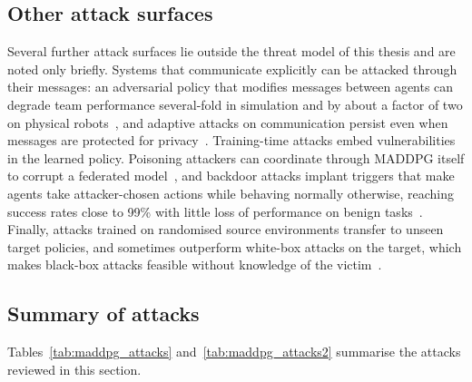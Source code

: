 \subsection{Other attack surfaces}
\label{subsec:lit_other_attacks}

Several further attack surfaces lie outside the threat model of this thesis and are
noted only briefly. Systems that communicate explicitly can be attacked through their
messages: an adversarial policy that modifies messages between agents can degrade team
performance several-fold in simulation and by about a factor of two on physical
robots~\cite{wu2023hijacking}, and adaptive attacks on communication persist even when
messages are protected for privacy~\cite{zhao2023dpmac,yuan2023communicationrobustmultiagentlearningadaptable}.
Training-time attacks embed vulnerabilities in the learned policy. Poisoning attackers
can coordinate through MADDPG itself to corrupt a federated model~\cite{shen2021coordinated},
and backdoor attacks implant triggers that make agents take attacker-chosen actions
while behaving normally otherwise, reaching success rates close to 99\% with little loss
of performance on benign
tasks~\cite{dai2025effectivebackdoorattackgraph,guo2025pnact,guo2023policycleanse,chen2022backdoorattacksmultiagentcollaborative}.
Finally, attacks trained on randomised source environments transfer to unseen target
policies, and sometimes outperform white-box attacks on the target, which makes
black-box attacks feasible without knowledge of the victim~\cite{pan2020transferable}.

\subsection{Summary of attacks}
\label{subsec:lit_attack_tables}

Tables~\ref{tab:maddpg_attacks} and~\ref{tab:maddpg_attacks2} summarise the attacks
reviewed in this section.

